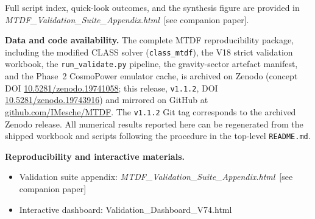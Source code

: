 \documentclass[11pt,a4paper]{article}
\begin{document}
\begin{table}[H]
\end{table}

Full script index, quick-look outcomes, and the synthesis figure are provided in
\textit{MTDF\_\allowbreak{}Validation\_\allowbreak{}Suite\_\allowbreak{}Appendix.html}~[see companion paper].

\begin{mdframed}[linecolor=accent,linewidth=0.5pt,backgroundcolor=callout-bg,leftline=true,rightline=true,topline=true,bottomline=true,innerleftmargin=8pt,innerrightmargin=8pt,innertopmargin=6pt,innerbottommargin=6pt]
\textbf{Data and code availability.}
The complete MTDF reproducibility package, including the modified CLASS solver
(\texttt{class\_\allowbreak{}mtdf}), the V18 strict validation workbook, the
\texttt{run\_\allowbreak{}validate.py} pipeline, the gravity-sector artefact
manifest, and the Phase~2 CosmoPower emulator cache, is archived on Zenodo
(concept DOI \href{https://doi.org/10.5281/zenodo.19741058}{10.5281/\allowbreak{}zenodo.\allowbreak{}19741058};
this release, \texttt{v1.1.2}, DOI
\href{https://doi.org/10.5281/zenodo.19743916}{10.5281/\allowbreak{}zenodo.\allowbreak{}19743916})
and mirrored on GitHub at
\href{https://github.com/IMesche/MTDF}{github.com/\allowbreak{}IMesche/\allowbreak{}MTDF}.
The \texttt{v1.1.2} Git tag corresponds to the archived Zenodo release. All
numerical results reported here can be regenerated from the shipped workbook
and scripts following the procedure in the top-level \texttt{README.md}.

\textbf{Reproducibility and interactive materials.}\begin{itemize}
  \item Validation suite appendix: \textit{MTDF\_\allowbreak{}Validation\_\allowbreak{}Suite\_\allowbreak{}Appendix.html}~[see companion paper]
  \item Interactive dashboard: Validation\_\allowbreak{}Dashboard\_\allowbreak{}V74.html
\end{itemize}
\end{mdframed}
\end{document}
